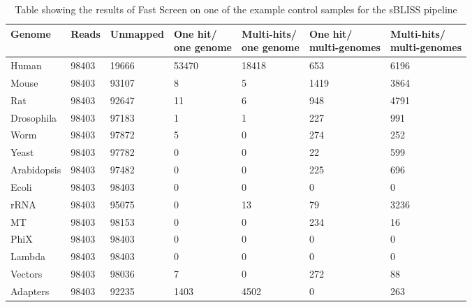 \begin{table}
\small
\caption{Table showing the results of Fast Screen on one of the example control samples for the sBLISS pipeline} 
\begin{tabular}{|p{}|p{}|p{}|p{}|p{}|p{}|p{}|}
 \hline
 Genome & Reads & Unmapped & \makecell{One hit/\\one genome} & \makecell{Multi-hits/\\one genome} & \makecell{One hit/\\multi-genomes} & \makecell{Multi-hits/\\multi-genomes}\\
 \hline
 Human & 98403 & 19666 & 53470 & 18418 & 653 & 6196\\
 \hline
 Mouse & 98403 & 93107 & 8 & 5 & 1419 & 3864\\
 \hline
 Rat & 98403 & 92647 & 11 & 6 & 948 & 4791\\
 \hline
 Drosophila & 98403 & 97183 & 1 & 1 & 227 & 991\\
 \hline
 Worm & 98403 & 97872 & 5 & 0 & 274 & 252\\
 \hline
 Yeast & 98403 & 97782 & 0 & 0 & 22 & 599\\
 \hline
 Arabidopsis & 98403 & 97482 & 0 & 0 & 225 & 696\\
 \hline
 Ecoli & 98403 & 98403 & 0 & 0 & 0 & 0\\
 \hline
 rRNA & 98403 & 95075 & 0 & 13 & 79 & 3236\\
 \hline
 MT & 98403 & 98153 & 0 & 0 & 234 & 16\\
 \hline
 PhiX & 98403 & 98403 & 0 & 0 & 0 & 0\\
 \hline
 Lambda & 98403 & 98403 & 0 & 0 & 0 & 0\\
 \hline
 Vectors & 98403 & 98036 & 7 & 0 & 272 & 88\\
 \hline
 Adapters & 98403 & 92235 & 1403 & 4502 & 0 & 263\\
 \hline
\end{tabular}
\label{tab:fast_screen}
\end{table}

